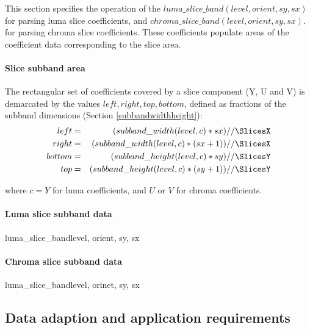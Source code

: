This section specifies the operation of the $luma\_slice\_band( level,orient,sy,sx)$ for 
parsing luma slice coefficients, and $chroma\_slice\_band( level,orient,sy,sx)$. for 
parsing chroma slice coefficients.
These coefficients populate areas of the coefficient data corresponding to the slice area.

\paragraph{Slice subband area\\}

The rectangular set of coefficients covered by a slice component (Y, U and V) 
is demarcated by the values $left, right, top, bottom$, defined as fractions
of the subband dimensions (Section \ref{subbandwidthheight}):
\begin{eqnarray*}
  left & = & (subband\_width(level,c)*sx)//\SlicesX \\
  right & = & (subband\_width(level,c)*(sx+1))//\SlicesX \\
  bottom & = & (subband\_height(level,c)*sy)//\SlicesY \\
  top & = & (subband\_height(level,c)*(sy+1))//\SlicesY
\end{eqnarray*}

where $c=Y$ for luma coefficients, and $U$ or $V$ for chroma coefficients.

\paragraph{Luma slice subband data\\}
\label{lumasliceband}

\begin{pseudo}{luma\_slice\_band}{level, orient, sy, sx}
  \bsEND
\bsEND
\end{pseudo}

\paragraph{Chroma slice subband data\\}
\label{chromasliceband}

\begin{pseudo}{luma\_slice\_band}{level, orinet, sy, sx}
  \bsEND
\bsEND
\end{pseudo}

\begin{informative*}
\subsection{Data adaption and application requirements}
\label{apps}

\end{informative*}